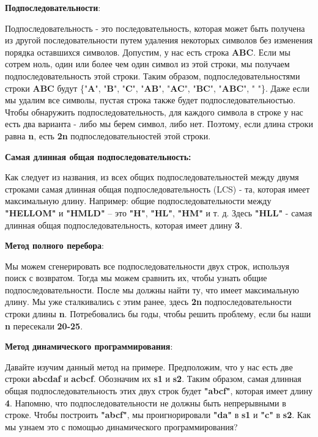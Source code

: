 \textbf{Подпоследовательности}:
\vspace{\baselineskip}

Подпоследовательность - это последовательность, которая может быть
получена из другой последовательности путем удаления некоторых
символов без изменения порядка оставшихся символов. Допустим, у нас есть
строка \textbf{ABC}. Если мы сотрем ноль, один или более чем один символ из этой
строки, мы получаем подпоследовательность этой строки. Таким образом,
подпоследовательностями строки \textbf{ABC} будут \{"\textbf{A}", "\textbf{B}", "\textbf{C}", "\textbf{AB}", "\textbf{AC}", "\textbf{BC}", "\textbf{ABC}", "\textbf{ }"\}. Даже если мы удалим все символы, пустая строка также будет
подпоследовательностью. Чтобы обнаружить подпоследовательность, для
каждого символа в строке у нас есть два варианта - либо мы берем символ, либо нет.
Поэтому, если длина строки равна \textbf{n}, есть \textbf{2n} 
подпоследовательностей этой строки.
\vspace{\baselineskip}

\textbf{Самая длинная общая подпоследовательность:}
\vspace{\baselineskip}

Как следует из названия, из всех общих подпоследовательностей между
двумя строками самая длинная общая подпоследовательность (LCS) - та,
которая имеет максимальную длину. Например: общие
подпоследовательности между \textbf{"HELLOM"} и \textbf{"HMLD"} – это \textbf{"H"}, \textbf{"HL"}, \textbf{"HM"} и т.
д. Здесь \textbf{"HLL"} - самая длинная общая подпоследовательность, которая имеет
длину \textbf{3}.
\vspace{\baselineskip}

\textbf{Метод полного перебора}:
\vspace{\baselineskip}

Мы можем сгенерировать все подпоследовательности двух строк, используя
поиск с возвратом. Тогда мы можем сравнить их, чтобы узнать общие
подпоследовательности. После мы должны найти ту, что имеет
максимальную длину. Мы уже сталкивались с этим ранее, здесь \textbf{2n}
подпоследовательности строки длины \textbf{n}. Потребовались бы годы, чтобы
решить проблему, если бы наши \textbf{n} пересекали \textbf{20-25}.
\vspace{\baselineskip}

\textbf{Метод динамического программирования}:
\vspace{\baselineskip}

Давайте изучим данный метод на примере. Предположим, что у нас есть две
строки \textbf{abcdaf} и \textbf{acbcf}. Обозначим их \textbf{s1} и \textbf{s2}. Таким образом, самая длинная
общая подпоследовательность этих двух строк будет \textbf{"abcf"}, которая имеет
длину \textbf{4}. Напомню, что подпоследовательности не должны быть
непрерывными в строке. Чтобы построить \textbf{"abcf"}, мы проигнорировали \textbf{"da"}
в \textbf{s1} и \textbf{"c"} в \textbf{s2}. Как мы узнаем это с помощью динамического
программирования?
\vspace{\baselineskip}

